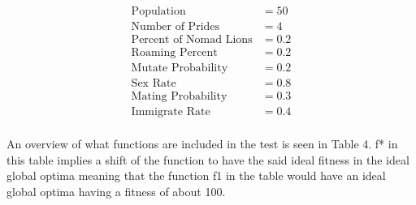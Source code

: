 \begin{align*}
\text{Population} &= 50\\
\text{Number of Prides} &= 4\\
\text{Percent of Nomad Lions} &= 0.2\\
\text{Roaming Percent} &= 0.2\\
\text{Mutate Probability} &= 0.2\\
\text{Sex Rate} &= 0.8\\
\text{Mating Probability} &= 0.3\\
\text{Immigrate Rate} &= 0.4\\
\end{align*}

\par An overview of what functions are included in the test is seen in Table 4. f* in this table implies a shift of the function to have the said ideal fitness in the ideal global optima meaning that the function f1 in the table would have an ideal global optima having a fitness of about 100.

\clearpage

